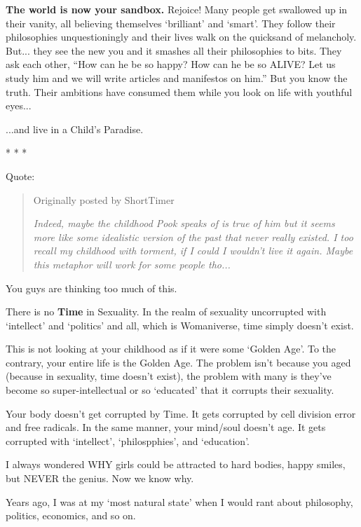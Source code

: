 			\textbf{The world is now your sandbox.} Rejoice! Many people get swallowed up in their vanity, all believing themselves `brilliant' and `smart'. They follow their philosophies unquestioningly and their lives walk on the quicksand of melancholy. But... they see the new you and it smashes all their philosophies to bits. They ask each other, ``How can he be so happy? How can he be so ALIVE? Let us study him and we will write articles and manifestos on him.'' But you know the truth. Their ambitions have consumed them while you look on life with youthful eyes...

			...and live in a Child's Paradise.
			
			\begin{center}
			* * * 
			\end{center}
			
			Quote:
			
				\begin{quote}
				Originally posted by ShortTimer
				
				\textit{Indeed, maybe the childhood Pook speaks of is true of him but it seems more like some idealistic version of the past that never really existed. I too recall my childhood with torment, if I could I wouldn't live it again. Maybe this metaphor will work for some people tho...}
				\end{quote}
				
			\noindent You guys are thinking too much of this.

			There is no \textbf{Time} in Sexuality. In the realm of sexuality uncorrupted with `intellect' and `politics' and all, which is Womaniverse, time simply doesn't exist.

			This is not looking at your childhood as if it were some `Golden Age'. To the contrary, your entire life is the Golden Age. The problem isn't because you aged (because in sexuality, time doesn't exist), the problem with many is they've become so super-intellectual or so `educated' that it corrupts their sexuality.

			Your body doesn't get corrupted by Time. It gets corrupted by cell division error and free radicals. In the same manner, your mind/soul doesn't age. It gets corrupted with `intellect', `philospphies', and `education'.

			I always wondered WHY girls could be attracted to hard bodies, happy smiles, but NEVER the genius. Now we know why.

			Years ago, I was at my `most natural state' when I would rant about philosophy, politics, economics, and so on.

